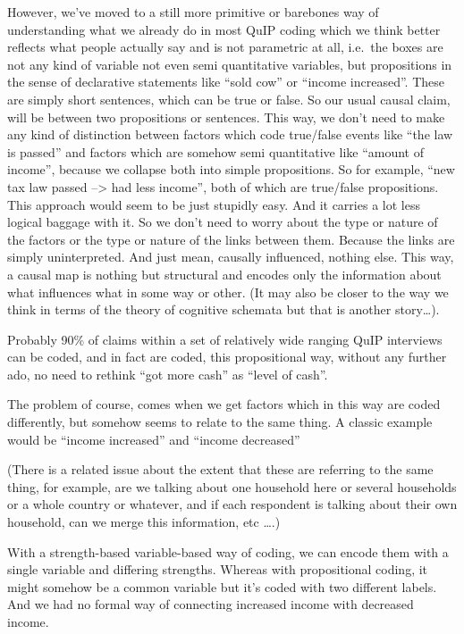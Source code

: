 \documentclass[
]{book}
\begin{document}
However, we've moved to a still more primitive or barebones way of understanding what we already do in most QuIP coding
which we think better reflects what people actually say and is not parametric at all, i.e.~the boxes are not any kind of variable not even semi quantitative variables, but propositions in the sense of declarative statements like ``sold cow'' or ``income increased''. These are simply short sentences, which can be true or false. So our usual causal claim, will be between
two propositions or sentences. This way, we don't need to make any kind of distinction between factors which
code true/false events like ``the law is passed'' and factors which are somehow semi quantitative like ``amount of income'', because we collapse both into simple propositions. So for example, ``new tax law passed --\textgreater{} had less income'', both of which are true/false propositions. This approach would seem to be just stupidly easy. And it carries a lot less logical baggage with it. So we don't need to worry about the type or nature of the factors or the type or nature of the links between them. Because the links are simply uninterpreted. And just mean, causally influenced, nothing else. This way, a causal map is nothing but structural and encodes only the information about what influences what in some way or other. (It may also be closer to the way we think in terms of the theory of cognitive schemata but that is another story\ldots).

Probably 90\% of claims within a set of relatively wide ranging QuIP interviews can be coded, and in fact are coded, this propositional way, without any further ado, no need to rethink ``got more cash'' as ``level of cash''.

The problem of course, comes when we get factors which in this way are coded differently, but somehow seems to relate to the same thing. A classic example would be ``income increased'' and ``income decreased''

(There is a related issue about the extent that these are referring to the same thing, for example, are we talking about one household here or several households or a whole country or whatever, and if each respondent is talking about their own household, can we merge this information, etc \ldots.)

With a strength-based variable-based way of coding, we can encode them with a single variable and differing strengths.
Whereas with propositional coding, it might somehow be a common variable but it's coded with two different labels. And we had no formal way of connecting increased income with decreased income.
\end{document}

